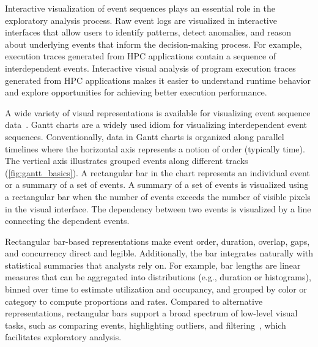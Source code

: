 \begin{refsection}
Interactive visualization of event sequences plays an essential role in the exploratory analysis process. Raw event logs are visualized in interactive interfaces that allow users to identify patterns, detect anomalies, and reason about underlying events that inform the decision-making process. For example, execution traces generated from HPC applications contain a sequence of interdependent events. Interactive visual analysis of program execution traces generated from HPC applications makes it easier to understand runtime behavior and explore opportunities for achieving better execution performance. 


A wide variety of visual representations is available for visualizing event sequence data~\cite{yeshchenko2024survey, guo2021survey}. Gantt charts are a widely used idiom for visualizing interdependent event sequences. Conventionally, data in Gantt charts is organized along parallel timelines where the horizontal axis represents a notion of order (typically time). The vertical axis illustrates grouped events along different tracks (\autoref{fig:gantt_basics}). A rectangular bar in the chart represents an individual event or a summary of a set of events. A summary of a set of events is visualized using a rectangular bar when the number of events exceeds the number of visible pixels in the visual interface. The dependency between two events is visualized by a line connecting the dependent events.

Rectangular bar-based representations make event order, duration, overlap, gaps, and concurrency direct and legible. Additionally, the bar integrates naturally with statistical summaries that analysts rely on. For example, bar lengths are linear measures that can be aggregated into distributions (e.g., duration or histograms), binned over time to estimate utilization and occupancy, and grouped by color or category to compute proportions and rates. Compared to alternative representations, rectangular bars support a broad spectrum of low-level visual tasks, such as comparing events, highlighting outliers, and filtering~\cite{sakin2024gantttaxonomy}, which facilitates exploratory analysis.


\end{refsection}
